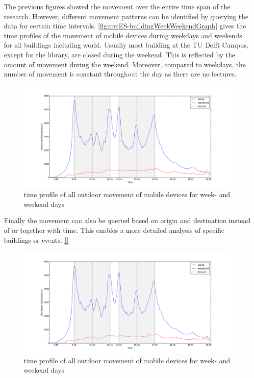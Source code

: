 The previous figures showed the movement over the entire time span of the research. However, different movement patterns can be identified by querying the data for certain time intervals. \autoref{figure:ES-buildingWeekWeekendGraph} gives the time profiles of the movement of mobile devices during weekdays and weekends for all buildings including world. Usually most building at the TU Delft Campus, except for the library, are closed during the weekend. This is reflected by the amount of movement during the weekend. Moreover, compared to weekdays, the number of movement is constant throughout the day as there are no lectures.

\begin{figure}[H]
\centering
\includegraphics[scale=0.2]{building_weekWeekend_graph.png}
\captionsetup{justification=centering}
\caption{time profile of all outdoor movement of mobile devices for week- and weekend days}
\label{figure:ES-buildingWeekWeekendGraph}
\end{figure}

Finally the movement can also be queried based on origin and destination instead of or together with time. This enables a more detailed analysis of specific buildings or events. \autoref{}

\begin{figure}[H]
\centering
\includegraphics[scale=0.2]{building_weekWeekend_graph.png}
\captionsetup{justification=centering}
\caption{time profile of all outdoor movement of mobile devices for week- and weekend days}
\label{figure:ES-buildingWeekWeekendGraph}
\end{figure}


